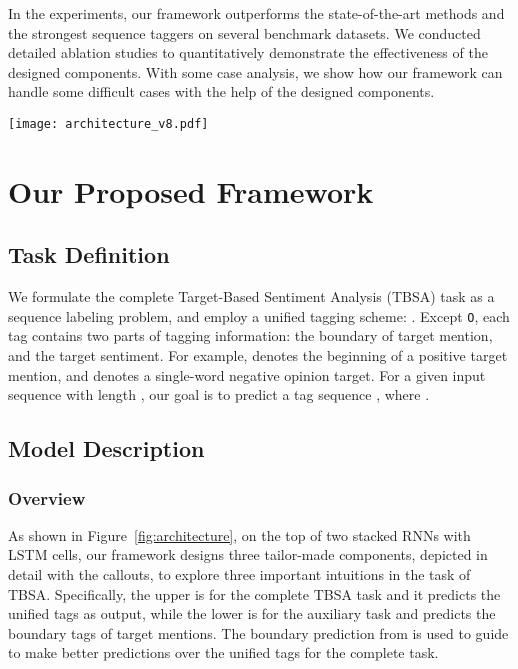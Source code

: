\documentclass[letterpaper]{article} \usepackage{aaai19}  \usepackage{times}  \usepackage{helvet}  \usepackage{courier}  \usepackage{url}  \usepackage{graphicx}  \frenchspacing  \setlength{\pdfpagewidth}{8.5in}  \setlength{\pdfpageheight}{11in}
\begin{document}
In the experiments, our framework outperforms the state-of-the-art methods and the strongest sequence taggers on several benchmark datasets. We conducted detailed ablation studies to quantitatively demonstrate the effectiveness of the designed components. With some case analysis, we show how our framework can handle some difficult cases with the help of the designed components.

\begin{figure*}
    \centering
    \texttt{[image: architecture\_v8.pdf]}
    \caption{Architecture of the proposed framework.}
    \label{fig:architecture}
\end{figure*}


\section{Our Proposed Framework}
\subsection{Task Definition}

We formulate the complete Target-Based Sentiment Analysis (TBSA) task as a sequence labeling problem, and employ a unified tagging scheme: . 
Except \texttt{O}, each tag contains two parts of tagging information: the boundary of target mention, and the target sentiment. For example,  denotes the beginning of a positive target mention, and  denotes a single-word negative opinion target. 
For a given input sequence  with length , our goal is to predict a tag sequence , where .


\subsection{Model Description}
\subsubsection{Overview}
As shown in Figure~\ref{fig:architecture}, on the top of two stacked RNNs with LSTM cells, our framework designs three tailor-made components, depicted in detail with the callouts, to explore three important intuitions in the task of TBSA. 
Specifically, the upper  is for the complete TBSA task and it predicts the unified tags as output, while the lower  is for the auxiliary task and predicts the boundary tags of target mentions. The boundary prediction from  is used to guide  to make better predictions over the unified tags for the complete task. 
\end{document}
